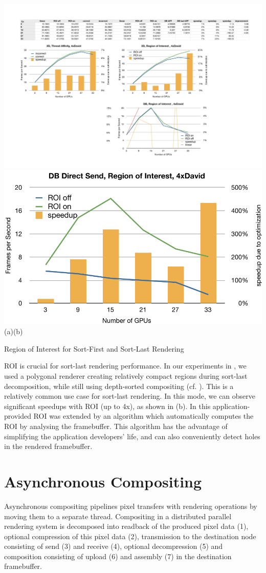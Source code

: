\begin{benchmark}[h!t]\center
    \includegraphics[width=.48\textwidth]{results/roiSF}\hfil
    \includegraphics[width=.48\textwidth]{results/roiSL}\\{\small(a)\hspace{.5\textwidth}(b)}\\
 {\caption{\label{rROI}Region of Interest for Sort-First and Sort-Last Rendering}}
\end{benchmark}

ROI is crucial for sort-last rendering performance. In our experiments in
\cite{EBAHMP:12}, we used a polygonal renderer creating relatively compact
regions during sort-last decomposition, while still using depth-sorted
compositing (cf. ). This is a relatively common use case for
sort-last rendering. In this mode, we can observe significant speedups with ROI
(up to 4x), as shown in (b). In \cite{MEP:10} this
application-provided ROI was extended by an algorithm which automatically
computes the ROI by analysing the framebuffer. This algorithm has the advantage
of simplifying the application developers' life, and can also conveniently
detect holes in the rendered framebuffer.


\section{Asynchronous Compositing}

Asynchronous compositing pipelines pixel transfers with rendering operations by
moving them to a separate thread. Compositing in a distributed parallel
rendering system is decomposed into readback of the produced pixel data (1),
optional compression of this pixel data (2), transmission to the destination
node consisting of send (3) and receive (4), optional decompression (5) and
composition consisting of upload (6) and assembly (7) in the destination
framebuffer.

